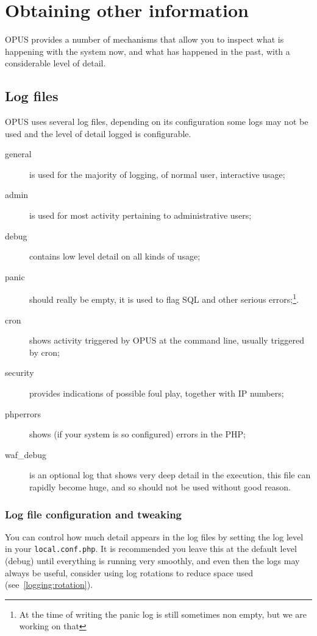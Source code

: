 \documentclass[12 pt]{book}
\begin{document}
%
%
%

\chapter{Obtaining other information}

OPUS provides a number of mechanisms that allow you to inspect what is happening with the
system now, and what has happened in the past, with a considerable level of detail.

\section{Log files}

OPUS uses several log files, depending on its configuration some logs may not be used and
the level of detail logged is configurable.

\begin{description}
  \item[general] is used for the majority of logging, of normal user, interactive usage;
  \item[admin] is used for most activity pertaining to administrative users;
  \item[debug] contains low level detail on all kinds of usage;
  \item[panic] should really be empty, it is used to flag SQL and other serious errors;\footnote{At the time of writing the panic log is still sometimes non empty, but we are working on that}.
  \item[cron] shows activity triggered by OPUS at the command line, usually triggered by cron;
  \item[security] provides indications of possible foul play, together with IP numbers;
  \item[phperrors] shows (if your system is so configured) errors in the PHP;
  \item[waf\_debug] is an optional log that shows very deep detail in the execution, this file can rapidly become huge, and so should not be used without good reason.
\end{description}

\subsection{Log file configuration and tweaking}

You can control how much detail appears in the log files by setting the log level in your \lstinline!local.conf.php!.
It is recommended you leave this at the default level (debug) until everything is running very smoothly, and even then
the logs may always be useful, consider using log rotations to reduce space used (see~\ref{logging:rotation}).
\end{document}
